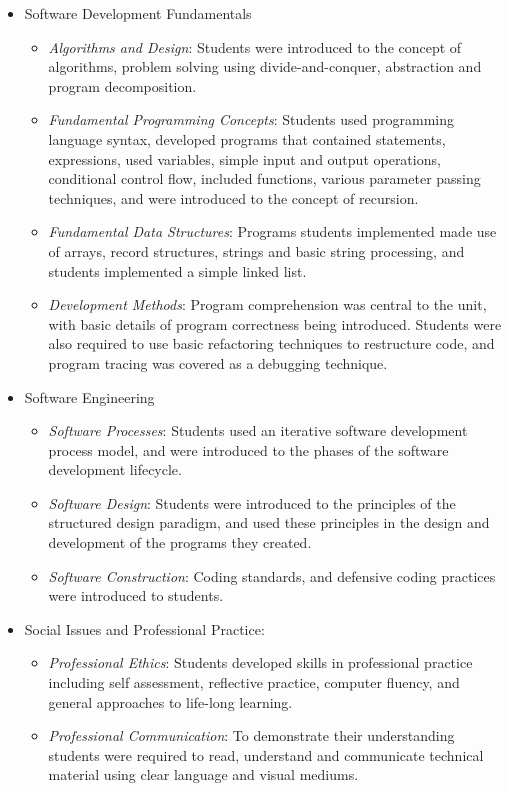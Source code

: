 \begin{itemize}[noitemsep,nolistsep]
	\item Software Development Fundamentals
	\begin{itemize}[noitemsep,nolistsep]
		\item \emph{Algorithms and Design}: Students were introduced to the concept of algorithms, problem solving using divide-and-conquer, abstraction and program decomposition.
		\item \emph{Fundamental Programming Concepts}: Students used programming language syntax, developed programs that contained statements, expressions, used variables, simple input and output operations, conditional control flow, included functions, various parameter passing techniques, and were introduced to the concept of recursion.
		\item \emph{Fundamental Data Structures}: Programs students implemented made use of arrays, record structures, strings and basic string processing, and students implemented a simple linked list.
		\item \emph{Development Methods}: Program comprehension was central to the unit, with basic details of program correctness being introduced. Students were also required to use basic refactoring techniques to restructure code, and program tracing was covered as a debugging technique.
	\end{itemize}

	\item Software Engineering
	\begin{itemize}[noitemsep,nolistsep]
		\item \emph{Software Processes}: Students used an iterative software development process model, and were introduced to the phases of the software development lifecycle. 
		\item \emph{Software Design}: Students were introduced to the principles of the structured design paradigm, and used these principles in the design and development of the programs they created.
		\item \emph{Software Construction}: Coding standards, and defensive coding practices were introduced to students.
	\end{itemize}

	\item Social Issues and Professional Practice:
	\begin{itemize}[noitemsep,nolistsep]
		\item \emph{Professional Ethics}: Students developed skills in professional practice including self assessment, reflective practice, computer fluency, and general approaches to life-long learning.
		\item \emph{Professional Communication}: To demonstrate their understanding students were required to read, understand and communicate technical material using clear language and visual mediums.
	\end{itemize}

\end{itemize}

